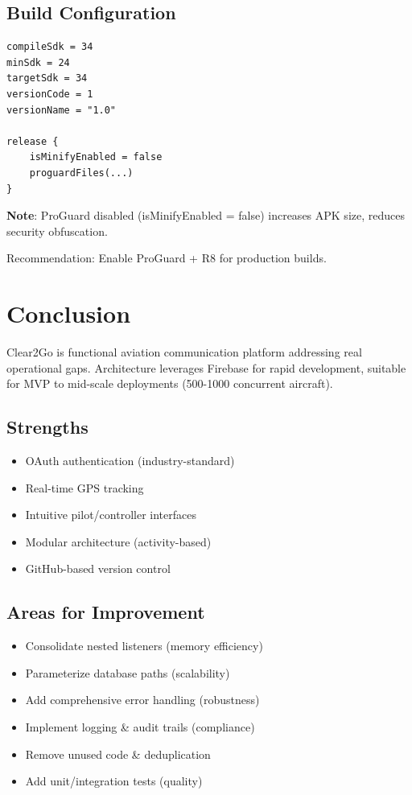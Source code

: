 \documentclass[11pt,a4paper]{report}
\begin{document}
\section{Build Configuration}

\begin{lstlisting}
compileSdk = 34
minSdk = 24
targetSdk = 34
versionCode = 1
versionName = "1.0"

release {
    isMinifyEnabled = false
    proguardFiles(...)
}
\end{lstlisting}

\textbf{Note}: ProGuard disabled (isMinifyEnabled = false) increases APK size, reduces security obfuscation.

Recommendation: Enable ProGuard + R8 for production builds.

\chapter{Conclusion}

Clear2Go is functional aviation communication platform addressing real operational gaps. Architecture leverages Firebase for rapid development, suitable for MVP to mid-scale deployments (500-1000 concurrent aircraft).

\section{Strengths}

\begin{itemize}
    \item OAuth authentication (industry-standard)
    \item Real-time GPS tracking
    \item Intuitive pilot/controller interfaces
    \item Modular architecture (activity-based)
    \item GitHub-based version control
\end{itemize}

\section{Areas for Improvement}

\begin{itemize}
    \item Consolidate nested listeners (memory efficiency)
    \item Parameterize database paths (scalability)
    \item Add comprehensive error handling (robustness)
    \item Implement logging \& audit trails (compliance)
    \item Remove unused code \& deduplication
    \item Add unit/integration tests (quality)
\end{itemize}
\end{document}
